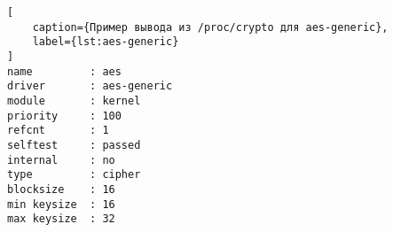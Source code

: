 \begin{lstlisting}[
    caption={Пример вывода из /proc/crypto для aes-generic},
    label={lst:aes-generic}
]
name         : aes
driver       : aes-generic
module       : kernel
priority     : 100
refcnt       : 1
selftest     : passed
internal     : no
type         : cipher
blocksize    : 16
min keysize  : 16
max keysize  : 32
\end{lstlisting}
